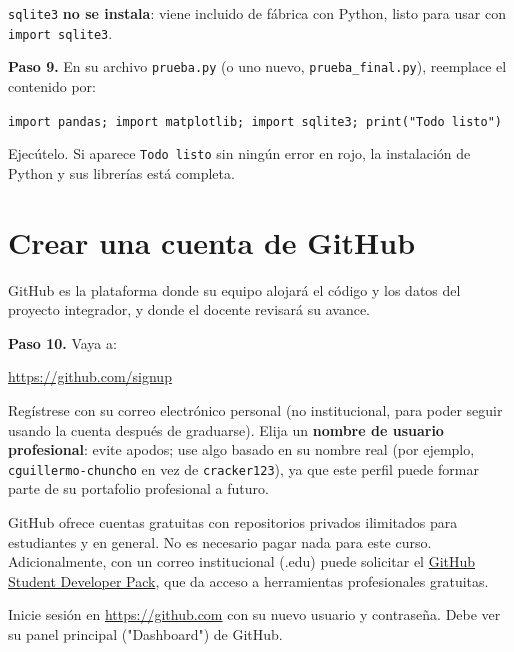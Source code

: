 \documentclass[11pt,a4paper]{article}
\newcommand{\code}[1]{\texttt{#1}}
\newcommand{\link}[1]{\url{#1}}
\begin{document}
\begin{tip}
\code{sqlite3} \textbf{no se instala}: viene incluido de fábrica con Python, listo para usar con \code{import sqlite3}.
\end{tip}

\begin{verify}
\textbf{Paso 9.} En su archivo \code{prueba.py} (o uno nuevo, \code{prueba\_final.py}), reemplace el contenido por:
\begin{center}\code{import pandas; import matplotlib; import sqlite3; print("Todo listo")}\end{center}
Ejecútelo. Si aparece \code{Todo listo} sin ningún error en rojo, la instalación de Python y sus librerías está completa.
\end{verify}

\section{Crear una cuenta de GitHub}

GitHub es la plataforma donde su equipo alojará el código y los datos del proyecto integrador, y donde el docente revisará su avance.

\begin{stepbox}
\textbf{Paso 10.} Vaya a:
\begin{center}\link{https://github.com/signup}\end{center}
Regístrese con su correo electrónico personal (no institucional, para poder seguir usando la cuenta después de graduarse). Elija un \textbf{nombre de usuario profesional}: evite apodos; use algo basado en su nombre real (por ejemplo, \code{cguillermo-chuncho} en vez de \code{cracker123}), ya que este perfil puede formar parte de su portafolio profesional a futuro.
\end{stepbox}

\begin{tip}
GitHub ofrece cuentas gratuitas con repositorios privados ilimitados para estudiantes y en general. No es necesario pagar nada para este curso. Adicionalmente, con un correo institucional (.edu) puede solicitar el \href{https://education.github.com/pack}{GitHub Student Developer Pack}, que da acceso a herramientas profesionales gratuitas.
\end{tip}

\begin{verify}
Inicie sesión en \link{https://github.com} con su nuevo usuario y contraseña. Debe ver su panel principal ("Dashboard") de GitHub.
\end{verify}
\end{document}
